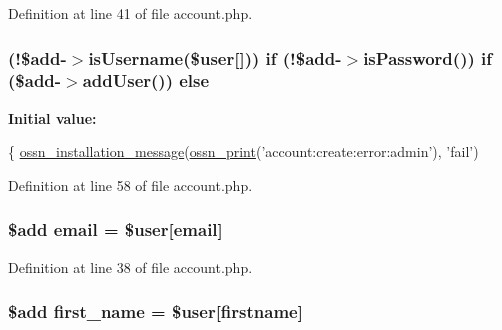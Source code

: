 Definition at line 41 of file account.\+php.

\subsubsection[{\texorpdfstring{else}{else}}]{ (!\${\bf add}-\/$>$is\+Username(\${\bf user}\mbox{[}\textquotesingle{}\mbox{]})) {\bf if} (!\${\bf add}-\/$>$is\+Password()) {\bf if} (\${\bf add}-\/$>$add\+User()) else}\hypertarget{actions_2account_8php_a49a98b4576a0eca7fdcd120dfc90f7a1}{}\label{actions_2account_8php_a49a98b4576a0eca7fdcd120dfc90f7a1}
{\bfseries Initial value\+:}
\begin{DoxyCode}
\{
    \hyperlink{ossn_8install_8php_a8b23c77f42cdb1f5638c78b7d61c9468}{ossn\_installation\_message}(\hyperlink{ossn_8lib_8languages_8php_a2be5d1c4b695593a9b9067b96df2150a}{ossn\_print}(\textcolor{stringliteral}{'account:create:error:admin'}), \textcolor{stringliteral}{
      'fail'})
\end{DoxyCode}


Definition at line 58 of file account.\+php.

\subsubsection[{\texorpdfstring{email}{email}}]{\setlength{\rightskip}{0pt plus 5cm}\${\bf add} email = \${\bf user}\mbox{[}\textquotesingle{}email\textquotesingle{}\mbox{]}}\hypertarget{actions_2account_8php_a011c66ae212438e0d7de7c0e40451bb3}{}\label{actions_2account_8php_a011c66ae212438e0d7de7c0e40451bb3}


Definition at line 38 of file account.\+php.

\subsubsection[{\texorpdfstring{first\+\_\+name}{first_name}}]{\setlength{\rightskip}{0pt plus 5cm}\${\bf add} first\+\_\+name = \${\bf user}\mbox{[}\textquotesingle{}firstname\textquotesingle{}\mbox{]}}\hypertarget{actions_2account_8php_a9a79298edb546fb2a33bc6d266131c04}{}\label{actions_2account_8php_a9a79298edb546fb2a33bc6d266131c04}


